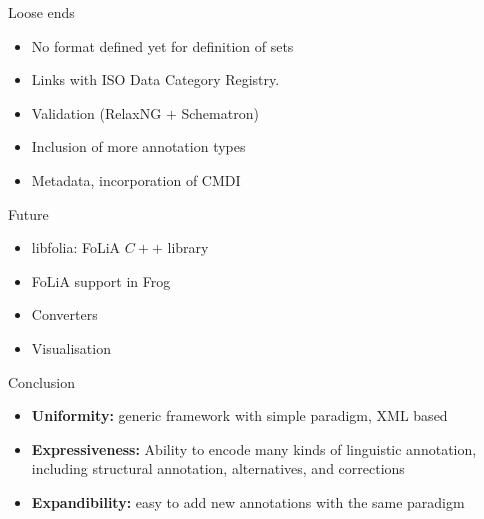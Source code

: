 \documentclass[compress]{beamer}
\begin{document}
\begin{frame}
    \begin{block}{Loose ends}
        \begin{itemize}
            \item No format defined yet for definition of sets
            \item Links with ISO Data Category Registry.
            \item Validation (RelaxNG $+$ Schematron)
            \item Inclusion of more annotation types            
            \item Metadata, incorporation of CMDI            
        \end{itemize}
    \end{block}
    
    \begin{block}{Future}
        \begin{itemize}
            \item libfolia: FoLiA $C++$ library
            \item FoLiA support in Frog
            \item Converters 
            \item Visualisation 
        \end{itemize}
    \end{block}

\end{frame}

\begin{frame}
    \begin{block}{Conclusion}
        \begin{itemize}
            \item \textbf{Uniformity:} generic framework with simple paradigm, XML based
            \item \textbf{Expressiveness:} Ability to encode many kinds of linguistic annotation, including structural annotation, alternatives, and corrections
            \item \textbf{Expandibility:} easy to add new annotations with the same paradigm
        \end{itemize}
    \end{block}


    \smallraccoon

\end{frame}
\end{document}
